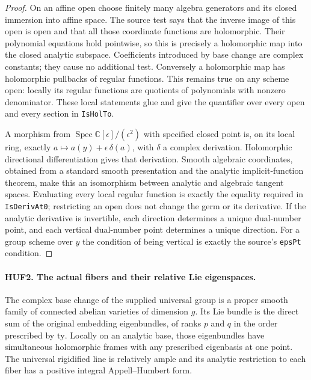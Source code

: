 \begin{proof}
On an affine open choose finitely many algebra generators and its
closed immersion into affine space.  The source test says that the
inverse image of this open is open and that all those coordinate
functions are holomorphic.  Their polynomial equations hold pointwise,
so this is precisely a holomorphic map into the closed analytic
subspace.  Coefficients introduced by base change are complex
constants; they cause no additional test.  Conversely a holomorphic
map has holomorphic pullbacks of regular functions.  This remains true
on any scheme open: locally its regular functions are quotients of
polynomials with nonzero denominator.  These local statements glue
and give the quantifier over every open and every section in
\texttt{IsHolTo}.

A morphism from \(\operatorname{Spec}\mathbb C[\epsilon]/(\epsilon^2)\)
with specified closed point is, on its local ring, exactly
\(a\mapsto a(y)+\epsilon\,\delta(a)\), with \(\delta\) a complex
derivation.  Holomorphic directional differentiation gives that
derivation.  Smooth algebraic coordinates, obtained from a standard
smooth presentation and the analytic implicit-function theorem, make
this an isomorphism between analytic and algebraic tangent spaces.
Evaluating every local regular function is exactly the equality
required in \texttt{IsDerivAt0}; restricting an open does not change
the germ or its derivative.  If the analytic derivative is invertible,
each direction determines a unique dual-number point, and each
vertical dual-number point determines a unique direction.
For a group scheme over \(y\) the condition of being vertical is
exactly the source's \texttt{epsPt} condition.
\end{proof}

\paragraph{HUF2. The actual fibers and their relative Lie eigenspaces.}
\label{claim:HUF2}
The complex base change of the supplied universal group is a proper
smooth family of connected abelian varieties of dimension \(g\).
Its Lie bundle is the direct sum of the original embedding
eigenbundles, of ranks \(p\) and \(q\) in the order prescribed
by \(\mathrm{ty}\).  Locally on an analytic base, those eigenbundles
have simultaneous holomorphic frames with any prescribed eigenbasis
at one point.  The universal rigidified line is relatively ample
and its analytic restriction to each fiber has a positive integral
Appell--Humbert form.


